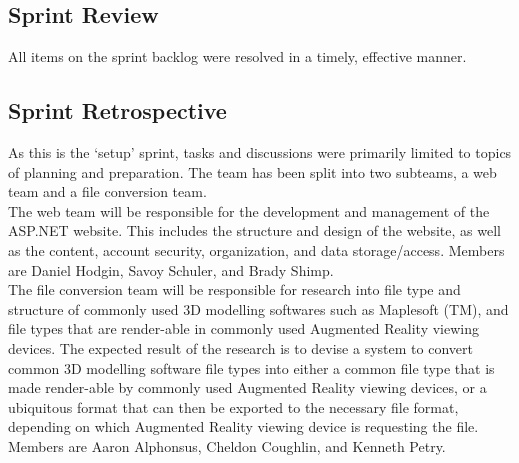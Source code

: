     \subsection{Sprint Review}
    \label{sec:Sprint0_review}
        \hspace{7mm}
        All items on the sprint backlog were resolved in a timely, effective manner.

    \subsection{Sprint Retrospective}
    \label{sec:Sprint0_retrospective}
        \hspace{7mm}
        As this is the `setup' sprint, tasks and discussions were primarily limited to topics of planning and preparation.
        The team has been split into two subteams, a web team and a file conversion team.\\ 

        The web team will be responsible for the development and management of the ASP.NET website.  This includes the
        structure and design of the website,  as well as the content, account security, organization, and data 
        storage/access.  Members are Daniel Hodgin, Savoy Schuler, and Brady Shimp.\\

        The file conversion team will be responsible for research into file type and structure of commonly used 3D modelling
        softwares such as Maplesoft (TM), and file types that are render-able in commonly used Augmented Reality viewing devices.
        The expected result of the research is to devise a system to convert common 3D modelling software file types into either
        a common file type that is made render-able by commonly used Augmented Reality viewing devices, or a ubiquitous format
        that can then be exported to the necessary file format, depending on which Augmented Reality viewing device is 
        requesting the file. Members are Aaron Alphonsus, Cheldon Coughlin, and Kenneth Petry.